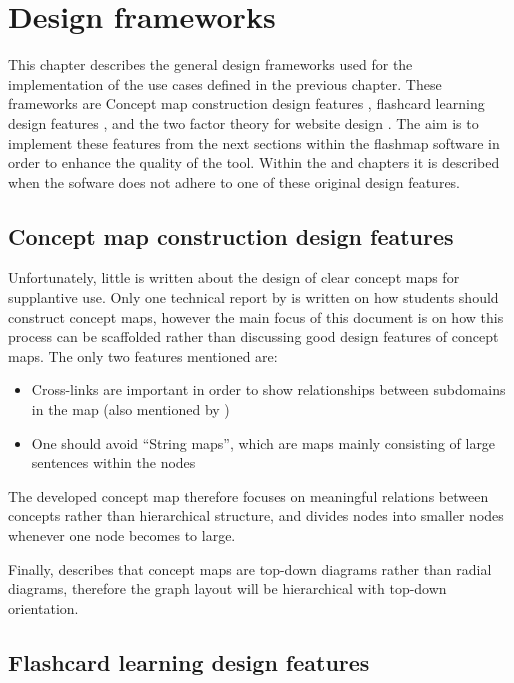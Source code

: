 \chapter{Design frameworks}
\label{ch:frameworks}

This chapter describes the general design frameworks used for the implementation of the use cases defined in the previous chapter. These frameworks are Concept map construction design features \cite{constructcmaps}, flashcard learning design features \cite{nakata}, and the two factor theory for website design \cite{websitedesign}. The aim is to implement these features from the next sections within the flashmap software in order to enhance the quality of the tool. Within the  and  chapters it is described when the sofware does not adhere to one of these original design features.

    \section{Concept map construction design features}
    \label{sec:cmapframework}

Unfortunately, little is written about the design of clear concept maps for supplantive use. Only one technical report by \cite{constructcmaps} is written on how students should construct concept maps, however the main focus of this document is on how this process can be scaffolded rather than discussing good design features of concept maps. The only two features mentioned are:

\begin{itemize}
    \item Cross-links are important in order to show relationships between subdomains in the map (also mentioned by )
    \item One should avoid ``String maps'', which are maps mainly consisting of large sentences within the nodes
\end{itemize}

The developed concept map therefore focuses on meaningful relations between concepts rather than hierarchical structure, and divides nodes into smaller nodes whenever one node becomes to large.

Finally,  describes that concept maps are top-down diagrams rather than radial diagrams, therefore the graph layout will be hierarchical with top-down orientation.

    \section{Flashcard learning design features}


